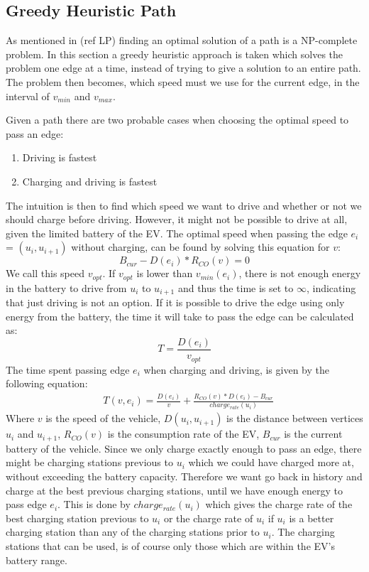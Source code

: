 \subsection{Greedy Heuristic Path}\label{sec:greedy}
As mentioned in (ref LP) finding an optimal solution of a path is a NP-complete problem. In this section a greedy heuristic approach is taken which solves the problem one edge at a time, instead of trying to give a solution to an entire path. The problem then becomes, which speed must we use for the current edge, in the interval of $v_{min}$ and $v_{max}$.

Given a path there are two probable cases when choosing the optimal speed to pass an edge:
\begin{enumerate}
	\item Driving is fastest
	\item Charging and driving is fastest
\end{enumerate}

The intuition is then to find which speed we want to drive and whether or not we should charge before driving. However, it might not be possible to drive at all, given the limited battery of the EV. The optimal speed when passing the edge $e_i$ = $(u_i, u_{i+1})$ without charging, can be found by solving this equation for $v$:
\[B_{cur} - D(e_i) * R_{CO}(v) = 0\] 
We call this speed $v_{opt}$. If $v_{opt}$ is lower than $v_{min}(e_i)$, there is not enough energy in the battery to drive from $u_i$ to $u_{i+1}$ and thus the time is set to $\infty$, indicating that just driving is not an option. If it is possible to drive the edge using only energy from the battery, the time it will take to pass the edge can be calculated as:
 \[T = \frac{D(e_i)}{v_{opt}} \] 
The time spent passing edge $e_i$ when charging and driving, is given by the following equation:
\begin{equation*}
\begin{aligned}
 & T(v,e_i) = \frac{D(e_i)}{v} + \frac{R_{CO}(v) * D(e_i) - B_{cur}}{charge_{rate}(u_{i})}
\end{aligned}
\end{equation*}\label{eq:drivingAndCharging}
Where $v$ is the speed of the vehicle, $D(u_i, u_{i+1})$ is the distance between vertices $u_i$ and $u_{i+1}$, $R_{CO}(v)$ is the consumption rate of the EV, $B_{cur}$ is the current battery of the vehicle. Since we only charge exactly enough to pass an edge, there might be charging stations previous to $u_i$ which we could have charged more at, without exceeding the battery capacity. Therefore we want go back in history and charge at the best previous charging stations, until we have enough energy to pass edge $e_i$. This is done by $charge_{rate}(u_i)$ which gives the charge rate of the best charging station previous to $u_{i}$ or the charge rate of $u_i$ if $u_i$ is a better charging station than any of the charging stations prior to $u_i$. The charging stations that can be used, is of course only those which are within the EV's battery range.

